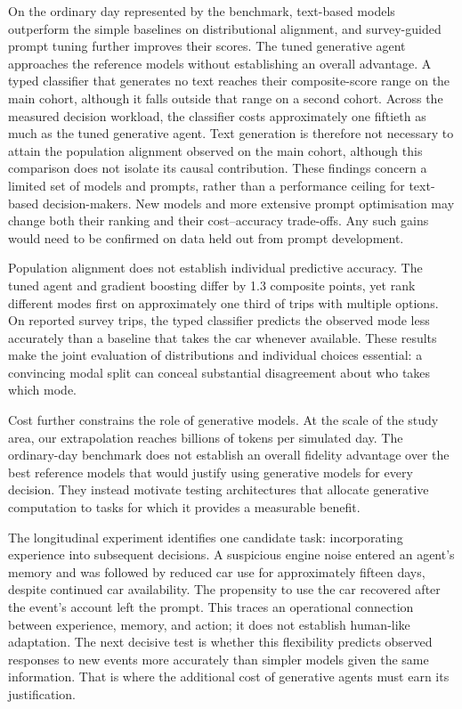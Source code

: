 On the ordinary day represented by the benchmark, text-based models outperform the simple baselines on distributional alignment, and survey-guided prompt tuning further improves their scores. The tuned generative agent approaches the reference models without establishing an overall advantage. A typed classifier that generates no text reaches their composite-score range on the main cohort, although it falls outside that range on a second cohort. Across the measured decision workload, the classifier costs approximately one fiftieth as much as the tuned generative agent. Text generation is therefore not necessary to attain the population alignment observed on the main cohort, although this comparison does not isolate its causal contribution. These findings concern a limited set of models and prompts, rather than a performance ceiling for text-based decision-makers. New models and more extensive prompt optimisation may change both their ranking and their cost–accuracy trade-offs. Any such gains would need to be confirmed on data held out from prompt development.

Population alignment does not establish individual predictive accuracy. The tuned agent and gradient boosting differ by 1.3 composite points, yet rank different modes first on approximately one third of trips with multiple options. On reported survey trips, the typed classifier predicts the observed mode less accurately than a baseline that takes the car whenever available. These results make the joint evaluation of distributions and individual choices essential: a convincing modal split can conceal substantial disagreement about who takes which mode.

Cost further constrains the role of generative models. At the scale of the study area, our extrapolation reaches billions of tokens per simulated day. The ordinary-day benchmark does not establish an overall fidelity advantage over the best reference models that would justify using generative models for every decision. They instead motivate testing architectures that allocate generative computation to tasks for which it provides a measurable benefit.

The longitudinal experiment identifies one candidate task: incorporating experience into subsequent decisions. A suspicious engine noise entered an agent’s memory and was followed by reduced car use for approximately fifteen days, despite continued car availability. The propensity to use the car recovered after the event’s account left the prompt. This traces an operational connection between experience, memory, and action; it does not establish human-like adaptation. The next decisive test is whether this flexibility predicts observed responses to new events more accurately than simpler models given the same information. That is where the additional cost of generative agents must earn its justification.